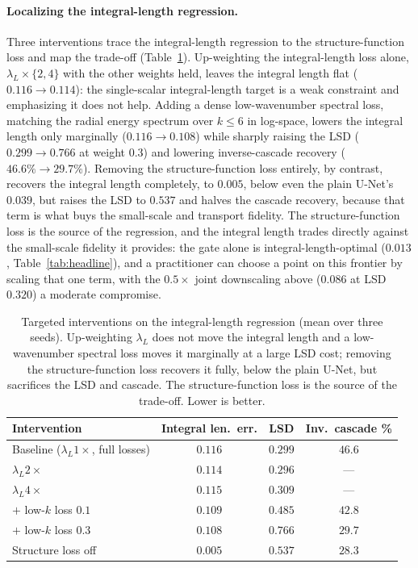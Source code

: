 \documentclass[10pt]{article} %
\begin{document}
\paragraph{Localizing the integral-length regression.} Three interventions trace the integral-length regression to the structure-function loss and map the trade-off (Table~\ref{tab:intlen}). Up-weighting the integral-length loss alone, $\lambda_L\times\{2,4\}$ with the other weights held, leaves the integral length flat ($0.116\to0.114$): the single-scalar integral-length target is a weak constraint and emphasizing it does not help. Adding a dense low-wavenumber spectral loss, matching the radial energy spectrum over $k\le 6$ in log-space, lowers the integral length only marginally ($0.116\to0.108$) while sharply raising the LSD ($0.299\to0.766$ at weight $0.3$) and lowering inverse-cascade recovery ($46.6\%\to29.7\%$). Removing the structure-function loss entirely, by contrast, recovers the integral length completely, to $0.005$, below even the plain U-Net's $0.039$, but raises the LSD to $0.537$ and halves the cascade recovery, because that term is what buys the small-scale and transport fidelity. The structure-function loss is the source of the regression, and the integral length trades directly against the small-scale fidelity it provides: the gate alone is integral-length-optimal ($0.013$, Table~\ref{tab:headline}), and a practitioner can choose a point on this frontier by scaling that one term, with the $0.5\times$ joint downscaling above ($0.086$ at LSD $0.320$) a moderate compromise.

\begin{table}[H]
\centering
\caption{Targeted interventions on the integral-length regression (mean over three seeds). Up-weighting $\lambda_L$ does not move the integral length and a low-wavenumber spectral loss moves it marginally at a large LSD cost; removing the structure-function loss recovers it fully, below the plain U-Net, but sacrifices the LSD and cascade. The structure-function loss is the source of the trade-off. Lower is better.}
\label{tab:intlen}
\begin{tabular}{lccc}
\toprule
Intervention & Integral len.\ err. & LSD & Inv.\ cascade \% \\
\midrule
Baseline ($\lambda_L 1\times$, full losses) & $0.116$ & $\mathbf{0.299}$ & $\mathbf{46.6}$ \\
$\lambda_L 2\times$ & $0.114$ & $0.296$ & --- \\
$\lambda_L 4\times$ & $0.115$ & $0.309$ & --- \\
$+$ low-$k$ loss $0.1$ & $0.109$ & $0.485$ & $42.8$ \\
$+$ low-$k$ loss $0.3$ & $0.108$ & $0.766$ & $29.7$ \\
Structure loss off & $\mathbf{0.005}$ & $0.537$ & $28.3$ \\
\bottomrule
\end{tabular}
\end{table}
\end{document}

